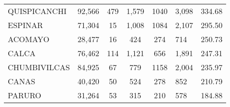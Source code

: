 \begin{tabular}{lrccclr}
	\cellcolor[HTML]{FFE699}QUISPICANCHI                           & 92,566                                                         & 479                                                         & 1,579                & 1040                     & 3,098                                                               & 334.68                                                                       \\
	\cellcolor[HTML]{FFE699}ESPINAR                                & 71,304                                                         & 15                                                          & 1,008                & 1084                     & 2,107                                                               & 295.50                                                                       \\
	\cellcolor[HTML]{FFE699}ACOMAYO                                & 28,477                                                         & 16                                                          & 424                  & 274                      & 714                                                                 & 250.73                                                                       \\
	\cellcolor[HTML]{FFE699}CALCA                                  & 76,462                                                         & 114                                                         & 1,121                & 656                      & 1,891                                                               & 247.31                                                                       \\
	\cellcolor[HTML]{FFE699}CHUMBIVILCAS                           & 84,925                                                         & 67                                                          & 779                  & 1158                     & 2,004                                                               & 235.97                                                                       \\
	\cellcolor[HTML]{C6E0B4}CANAS                                  & 40,420                                                         & 50                                                          & 524                  & 278                      & 852                                                                 & 210.79                                                                       \\
	\cellcolor[HTML]{C6E0B4}PARURO                                 & 31,264                                                         & 53                                                          & 315                  & 210                      & 578                                                                 & 184.88                                                                       \\

\end{tabular}
